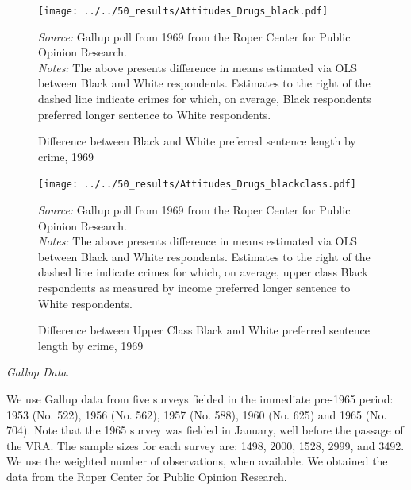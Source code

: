 \documentclass[12pt]{article}
\begin{document}
\begin{figure}[h!]
 \begin{center}
 \caption{Difference between Black and White preferred sentence length by crime, 1969}
 \small
		 \texttt{[image: ../../50\_results/Attitudes\_Drugs\_black.pdf]}
 \label{figure_dope}
 	\end{center}
 	{\scriptsize{\emph{Source:} Gallup poll from 1969 from the Roper Center for Public Opinion Research. }} \\
	{\scriptsize{\emph{Notes:} The above presents difference in means estimated via OLS between Black and White respondents.  Estimates to the right of the dashed line indicate crimes for which, on average, Black respondents preferred longer sentence to White respondents.  \singlespacing }}
\end{figure} \normalsize



\begin{figure}[h!]
 \begin{center}
 \caption{Difference between Upper Class Black and White preferred sentence length by crime, 1969}
 \small
		 \texttt{[image: ../../50\_results/Attitudes\_Drugs\_blackclass.pdf]}
 \label{figure_dope2}
 	\end{center}
 	{\scriptsize{\emph{Source:} Gallup poll from 1969 from the Roper Center for Public Opinion Research. }} \\
	{\scriptsize{\emph{Notes:} The above presents difference in means estimated via OLS between Black and White respondents.  Estimates to the right of the dashed line indicate crimes for which, on average, upper class Black respondents as measured by income preferred longer sentence to White respondents.  \singlespacing }}
\end{figure} \normalsize



\vspace{.25in}
\emph{Gallup Data}.

We use Gallup data from five surveys fielded in the immediate pre-1965 period: 1953 (No. 522), 1956 (No. 562), 1957 (No. 588), 1960 (No. 625) and 1965 (No. 704).  Note that the 1965 survey was fielded in January, well before the passage of the VRA.  The sample sizes for each survey are: 1498, 2000, 1528, 2999, and 3492.  We use the weighted number of observations, when available.  We obtained the data from the Roper Center for Public Opinion Research.
\end{document}
